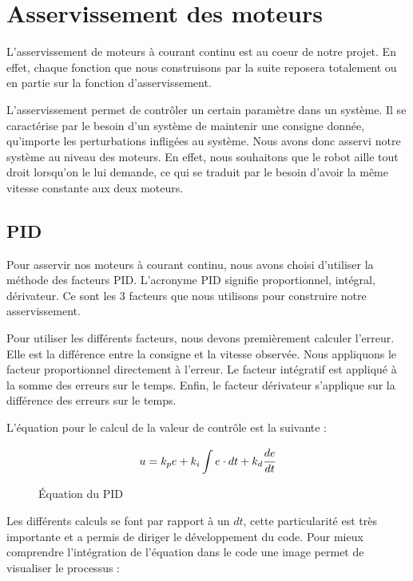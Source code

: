 \documentclass[
	a4paper,									%
	11pt,										%
	twoside,									%
	openright,									%
	notitlepage,									%
	parskip=half,								%
]{scrreprt}										%
\begin{document}
\chapter{Asservissement des moteurs}

L'asservissement de moteurs à courant continu est au coeur de notre projet. En effet, chaque fonction que nous construisons par la suite reposera totalement ou en partie sur la fonction d'asservissement. \par

L'asservissement permet de contrôler un certain paramètre dans un système. Il se caractérise par le besoin d'un système de maintenir une consigne donnée, qu'importe les perturbations infligées au système.
Nous avons donc asservi notre système au niveau des moteurs. En effet, nous souhaitons que le robot aille tout droit lorsqu'on le lui demande, ce qui se traduit par le besoin d'avoir
la même vitesse constante aux deux moteurs. \par

\section{PID}



Pour asservir nos moteurs à courant continu, nous avons choisi d'utiliser la méthode des facteurs PID. L'acronyme PID signifie proportionnel, intégral, dérivateur. Ce sont les 3 facteurs que nous 
utilisons pour construire notre asservissement. \par

Pour utiliser les différents facteurs, nous devons premièrement calculer l'erreur. Elle est la différence entre la consigne et la vitesse observée. Nous appliquons le facteur proportionnel directement à l'erreur.
Le facteur intégratif est appliqué à la somme des erreurs sur le temps. Enfin, le facteur dérivateur s'applique sur la différence des erreurs sur le temps. \par



L'équation pour le calcul de la valeur de contrôle est la suivante : 
		\begin{figure}[h]
			\[u=k_pe + k_i \int e \cdot dt + k_d \cfrac{de}{dt}\] 
			\caption{Équation du PID}
			\label{eq1}
		\end{figure}


Les différents calculs se font par rapport à un $dt$, cette particularité est très importante et a permis de diriger le développement du code. Pour mieux comprendre l'intégration de l'équation dans le code 
une image permet de visualiser le processus : 
\end{document}
